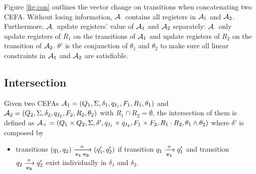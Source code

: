 Figure \ref{fig:con} outlines the vector change on transitions when concatenating two CEFA. Without losing information, $\mathcal{A}_{\cdot}$ contains all registers in $\mathcal{A}_1$ and $\mathcal{A}_2$. Furthermore, $\mathcal{A}_{\cdot}$ update registers' value of $\mathcal{A}_1$ and $\mathcal{A}_2$ separately: $\mathcal{A}_{\cdot}$ only update registers of $R_1$ on the transitions of $\mathcal{A}_1$ and update registers of $R_2$ on the transition of $\mathcal{A}_2$. $\theta'$ is the conjunction of $\theta_1$ and $\theta_2$ to make sure all linear constraints in $\mathcal{A}_1$ and $\mathcal{A}_2$ are satisfiable.
\subsection{Intersection}\label{subsec:inter}
Given two CEFAs $\mathcal{A}_1 = (Q_1, \Sigma, \delta_1, q_{I_1}, F_1, R_1, \theta_1)$ and $\mathcal{A}_2 = (Q_2, \Sigma, \delta_2, q_{I_2}, F_2, R_2, \theta_2)$ with $R_1\cap R_2 = \emptyset$, the intersection of them is defined as $\mathcal{A}_{\times} = (Q_1\times Q_2, \Sigma, \delta', q_{I_1}\times q_{I_2}, F_1\times F_2, R_1\cdot R_2, \theta_1\wedge \theta_2)$ where $\delta'$ is composed by
\begin{itemize}
  \item transitions $(q_1,q_2)\xrightarrow[\myvec{v_1}\cdot\myvec{v_2}]{a} (q_1',q_2')$ if transition $q_1\xrightarrow[\myvec{v_1}]{a}q_1'$ and transition $q_2\xrightarrow[\myvec{v_2}]{a}q_2'$ exist individually in  $\delta_1$ and $\delta_2$.
\end{itemize}
